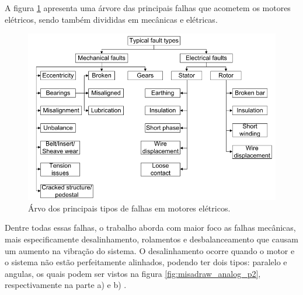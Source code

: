 A figura \ref{fig:faults_rilski_p77} apresenta uma árvore das principais falhas que acometem os motores elétricos, sendo também divididas
em mecânicas e elétricas. 

\begin{figure}[H]
    \caption{Árvo dos principais tipos de falhas em motores elétricos.}
    \begin{center}
        \includegraphics[scale=.45]{referencial/img/faults_rilski_p77.png}
    \end{center}
    \label{fig:faults_rilski_p77}
\end{figure}

Dentre todas essas falhas, o trabalho aborda com maior foco as falhas mecânicas, mais especificamente desalinhamento, rolamentos 
e desbalanceamento que causam um aumento na vibração do sistema. O desalinhamento ocorre quando o motor e o sistema não estão perfeitamente alinhados, podendo ter dois tipos:
paralelo e angulas, os quais podem ser vistos na figura \ref{fig:misadraw_analog_p2}, respectivamente na parte a) e b) 
\cite{Sopcik2019}.

